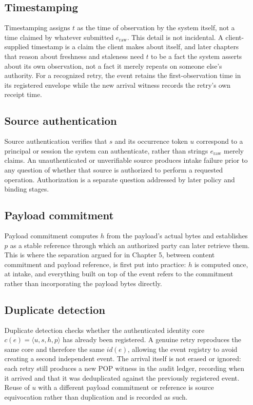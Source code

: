 \documentclass[11pt,openany]{book}
\begin{document}
\subsection{Timestamping}

Timestamping assigns \(t\) as the time of observation by the system itself,
not a time claimed by whatever submitted \(e_{\mathrm{raw}}\). This detail is
not incidental. A client-supplied timestamp is a claim the client makes about
itself, and later chapters that reason about freshness and staleness need
\(t\) to be a fact the system asserts about its own observation, not a fact it
merely repeats on someone else's authority. For a recognized retry, the event
retains the first-observation time in its registered envelope while the new
arrival witness records the retry's own receipt time.

\subsection{Source authentication}

Source authentication verifies that \(s\) and its occurrence token \(u\)
correspond to a principal or session the system can authenticate, rather than
strings \(e_{\mathrm{raw}}\) merely claims. An unauthenticated or unverifiable
source produces intake failure prior to any question of whether that source is
authorized to perform a requested operation. Authorization is a separate
question addressed by later policy and binding stages.

\subsection{Payload commitment}

Payload commitment computes \(h\) from the payload's actual bytes and
establishes \(p\) as a stable reference through which an authorized party can
later retrieve them. This is where the separation argued for in Chapter 5,
between content commitment and payload reference, is first put into practice:
\(h\) is computed once, at intake, and everything built on top of the event
refers to the commitment rather than incorporating the payload bytes directly.

\subsection{Duplicate detection}

Duplicate detection checks whether the authenticated identity core
\(c(e)=\langle u,s,h,p\rangle\) has already been registered. A genuine retry
reproduces the same core and therefore the same \(id(e)\), allowing the event
registry to avoid creating a second independent event. The arrival itself is
not erased or ignored: each retry still produces a new POP witness in the
audit ledger, recording when it arrived and that it was deduplicated against
the previously registered event. Reuse of \(u\) with a different payload
commitment or reference is source equivocation rather than duplication and is
recorded as such.
\end{document}

